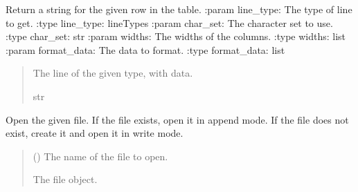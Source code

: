 \documentclass[letterpaper,10pt,english]{sphinxmanual}
\begin{document}
\begin{fulllineitems}
\begin{fulllineitems}
\label{\detokenize{nodes:nodes.nodePrinter.tablePrinter.get_line_with_data}}
\pysigstartsignatures
\pysiglinewithargsret
{}
{\sphinxparamcomma {}\sphinxparamcomma {}\sphinxparamcomma {}}
{}
\pysigstopsignatures
\sphinxAtStartPar
Return a string for the given row in the table.
:param line\_type: The type of line to get.
:type line\_type: lineTypes
:param char\_set: The character set to use.
:type char\_set: str
:param widths: The widths of the columns.
:type widths: list
:param format\_data: The data to format.
:type format\_data: list
\begin{quote}\begin{description}
\sphinxAtStartPar
The line of the given type, with data.

\sphinxAtStartPar
str

\end{description}\end{quote}

\end{fulllineitems}


\begin{fulllineitems}
\label{\detokenize{nodes:nodes.nodePrinter.tablePrinter.open_file}}
\pysigstartsignatures
\pysiglinewithargsret
{}
{}
{}
\pysigstopsignatures
\sphinxAtStartPar
Open the given file.
If the file exists, open it in append mode.
If the file does not exist, create it and open it in write mode.
\begin{quote}\begin{description}
\sphinxAtStartPar
{} () \textendash{} The name of the file to open.

\sphinxAtStartPar
The file object.


\end{description}
\end{quote}
\end{fulllineitems}
\end{fulllineitems}
\end{document}
